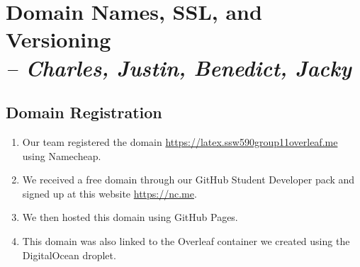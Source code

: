 \chapter[Domain Names]{Domain Names, SSL, and Versioning\\\small{\textit{-- Charles, Justin, Benedict, Jacky}}}
\label{Chapter::Domain Names}


\section{Domain Registration}
\begin{enumerate}
    \item Our team registered the domain \url{https://latex.ssw590group11overleaf.me} using Namecheap.
    \item We received a free domain through our GitHub Student Developer pack and signed up at this website \url{https://nc.me}.
    \item We then hosted this domain using GitHub Pages.
    \item This domain was also linked to the Overleaf container we created using the DigitalOcean droplet.
\end{enumerate}



